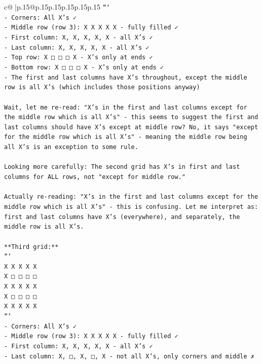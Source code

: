 \documentclass{article}
\begin{document}
{\begin{supertabular}{c@{$\;$}|p{.15\linewidth}@{}p{.15\linewidth}p{.15\linewidth}p{.15\linewidth}p{.15\linewidth}p{.15\linewidth}}
{{{\texttt{```} \\
\texttt{{-} Corners: All X's ✓} \\
\texttt{{-} Middle row (row 3): X X X X X {-} fully filled ✓} \\
\texttt{{-} First column: X, X, X, X, X {-} all X's ✓} \\
\texttt{{-} Last column: X, X, X, X, X {-} all X's ✓} \\
\texttt{{-} Top row: X □ □ □ X {-} X's only at ends ✓} \\
\texttt{{-} Bottom row: X □ □ □ X {-} X's only at ends ✓} \\
\texttt{{-} The first and last columns have X's throughout, except the middle row is all X's (which includes those positions anyway)} \\
\\ 
\texttt{Wait, let me re{-}read: "X's in the first and last columns except for the middle row which is all X's" {-} this seems to suggest the first and last columns should have X's except at middle row? No, it says "except for the middle row which is all X's" {-} meaning the middle row being all X's is an exception to some rule.} \\
\\ 
\texttt{Looking more carefully: The second grid has X's in first and last columns for ALL rows, not "except for middle row."} \\
\\ 
\texttt{Actually re{-}reading: "X's in the first and last columns except for the middle row which is all X's" {-} this is confusing. Let me interpret as: first and last columns have X's (everywhere), and separately, the middle row is all X's.} \\
\\ 
\texttt{**Third grid:**} \\
\texttt{```} \\
\texttt{X X X X X} \\
\texttt{X □ □ □ □} \\
\texttt{X X X X X} \\
\texttt{X □ □ □ □} \\
\texttt{X X X X X} \\
\texttt{```} \\
\texttt{{-} Corners: All X's ✓} \\
\texttt{{-} Middle row (row 3): X X X X X {-} fully filled ✓} \\
\texttt{{-} First column: X, X, X, X, X {-} all X's ✓} \\
\texttt{{-} Last column: X, □, X, □, X {-} not all X's, only corners and middle ✗} \\
}}}
\end{supertabular}}
\end{document}
